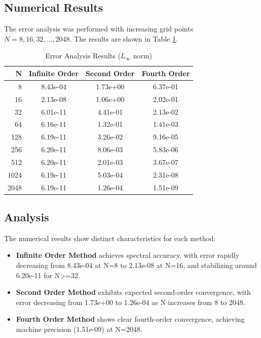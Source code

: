 \documentclass{article}
\begin{document}
\subsection{Numerical Results}
The error analysis was performed with increasing grid points $N = 8, 16, 32, ..., 2048$. The results are shown in Table \ref{tab:error_analysis_ex3}.

\begin{table}[htbp]
\centering
\caption{Error Analysis Results ($L_\infty$ norm)}
\label{tab:error_analysis_ex3}
\begin{tabular}{r|ccc}
\toprule
N & Infinite Order & Second Order & Fourth Order \\
\midrule
8 & 8.43e-04 & 1.73e+00 & 6.37e-01 \\
16 & 2.13e-08 & 1.06e+00 & 2.02e-01 \\
32 & 6.01e-11 & 4.41e-01 & 2.13e-02 \\
64 & 6.16e-11 & 1.32e-01 & 1.41e-03 \\
128 & 6.19e-11 & 3.26e-02 & 9.16e-05 \\
256 & 6.20e-11 & 8.06e-03 & 5.83e-06 \\
512 & 6.20e-11 & 2.01e-03 & 3.67e-07 \\
1024 & 6.19e-11 & 5.03e-04 & 2.31e-08 \\
2048 & 6.19e-11 & 1.26e-04 & 1.51e-09 \\
\bottomrule
\end{tabular}
\end{table}

\subsection{Analysis}
The numerical results show distinct characteristics for each method:

\begin{itemize}
    \item \textbf{Infinite Order Method} achieves spectral accuracy, with error rapidly decreasing from 8.43e-04 at N=8 to 2.13e-08 at N=16, and stabilizing around 6.20e-11 for N>=32.
    
    \item \textbf{Second Order Method} exhibits expected second-order convergence, with error decreasing from 1.73e+00 to 1.26e-04 as N increases from 8 to 2048.
    
    \item \textbf{Fourth Order Method} shows clear fourth-order convergence, achieving machine precision (1.51e-09) at N=2048.
\end{itemize}
\end{document}

